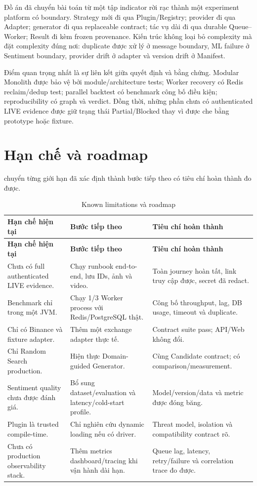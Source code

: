\documentclass[12pt,a4paper,oneside]{report}
\begin{document}
Đồ án đã chuyển bài toán từ một tập indicator rời rạc thành một experiment platform có boundary. Strategy mới đi qua Plugin/Registry; provider đi qua Adapter; generator đi qua replaceable contract; tác vụ dài đi qua durable Queue--Worker; Result đi kèm frozen provenance. Kiến trúc không loại bỏ complexity mà đặt complexity đúng nơi: duplicate được xử lý ở message boundary, ML failure ở Sentiment boundary, provider drift ở adapter và version drift ở Manifest.

Điểm quan trọng nhất là sự liên kết giữa quyết định và bằng chứng. Modular Monolith được bảo vệ bởi module/architecture tests; Worker recovery có Redis reclaim/dedup test; parallel backtest có benchmark công bố điều kiện; reproducibility có graph và verdict. Đồng thời, những phần chưa có authenticated LIVE evidence được giữ trạng thái Partial/Blocked thay vì được che bằng prototype hoặc fixture.

\section{Hạn chế và roadmap}

 chuyển từng giới hạn đã xác định thành bước tiếp theo có tiêu chí hoàn thành đo được.

\begin{longtable}{L{4.2cm}L{5.4cm}L{4.2cm}}
  \caption{Known limitations và roadmap}\label{tab:roadmap}\\
  \toprule
  \textbf{Hạn chế hiện tại} & \textbf{Bước tiếp theo} & \textbf{Tiêu chí hoàn thành} \\
  \midrule
  \endfirsthead
  \toprule
  \textbf{Hạn chế hiện tại} & \textbf{Bước tiếp theo} & \textbf{Tiêu chí hoàn thành} \\
  \midrule
  \endhead
  Chưa có full authenticated LIVE evidence. & Chạy runbook end-to-end, lưu IDs, ảnh và video. & Toàn journey hoàn tất, link truy cập được, secret đã redact. \\
  Benchmark chỉ trong một JVM. & Chạy 1/3 Worker process với Redis/PostgreSQL thật. & Công bố throughput, lag, DB usage, timeout và duplicate. \\
  Chỉ có Binance và fixture adapter. & Thêm một exchange adapter thực tế. & Contract suite pass; API/Web không đổi. \\
  Chỉ Random Search production. & Hiện thực Domain-guided Generator. & Cùng Candidate contract; có comparison/measurement. \\
  Sentiment quality chưa được đánh giá. & Bổ sung dataset/evaluation và latency/cold-start profile. & Model/version/data và metric được đóng băng. \\
  Plugin là trusted compile-time. & Chỉ nghiên cứu dynamic loading nếu có driver. & Threat model, isolation và compatibility contract rõ. \\
  Chưa có production observability stack. & Thêm metrics dashboard/tracing khi vận hành dài hạn. & Queue lag, latency, retry/failure và correlation trace đo được. \\
  \bottomrule
\end{longtable}
\end{document}
